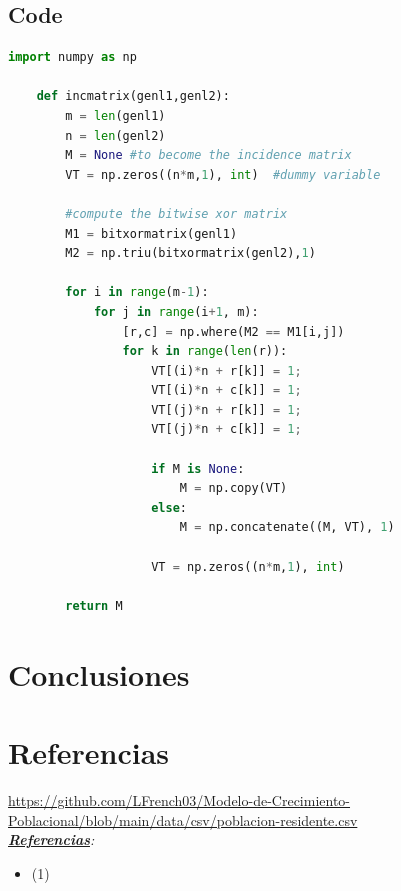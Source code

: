 \documentclass{article}
\begin{document}
\subsection{Code}
\begin{lstlisting}[language=Python, caption=Python example]
    import numpy as np
        
    def incmatrix(genl1,genl2):
        m = len(genl1)
        n = len(genl2)
        M = None #to become the incidence matrix
        VT = np.zeros((n*m,1), int)  #dummy variable
        
        #compute the bitwise xor matrix
        M1 = bitxormatrix(genl1)
        M2 = np.triu(bitxormatrix(genl2),1) 
    
        for i in range(m-1):
            for j in range(i+1, m):
                [r,c] = np.where(M2 == M1[i,j])
                for k in range(len(r)):
                    VT[(i)*n + r[k]] = 1;
                    VT[(i)*n + c[k]] = 1;
                    VT[(j)*n + r[k]] = 1;
                    VT[(j)*n + c[k]] = 1;
                    
                    if M is None:
                        M = np.copy(VT)
                    else:
                        M = np.concatenate((M, VT), 1)
                    
                    VT = np.zeros((n*m,1), int)
        
        return M
    \end{lstlisting}
\clearpage

\section{Conclusiones}

\cleardoublepage
\section{Referencias}
\url{https://github.com/LFrench03/Modelo-de-Crecimiento-Poblacional/blob/main/data/csv/poblacion-residente.csv}
\\\textit{\textbf{\underline{Referencias}}:}
\begin{itemize}
    \item (1)
\end{itemize}
\end{document}
